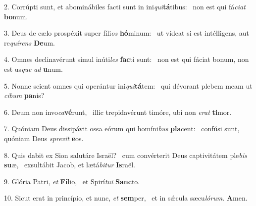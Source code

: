 2. Corrúpti sunt, et abominábiles facti sunt in ini\textit{qui}\textbf{tá}tibus: \ast\  non est qui fá\textit{ci}\textit{at} \textbf{bo}num.\

3. Deus de cælo prospéxit super fíli\textit{os} \textbf{hó}minum: \ast\  ut vídeat si est intélligens, aut re\textit{quí}\textit{rens} \textbf{De}um.\

4. Omnes declinavérunt simul inúti\textit{les} \textbf{fac}ti sunt: \ast\  non est qui fáciat bonum, non est us\textit{que} \textit{ad} \textbf{u}num.\

5. Nonne scient omnes qui operántur ini\textit{qui}\textbf{tá}tem: \ast\  qui dévorant plebem meam ut \textit{ci}\textit{bum} \textbf{pa}nis?\

6. Deum non invo\textit{ca}\textbf{vé}runt, \ast\  illic trepidavérunt timóre, ubi non \textit{e}\textit{rat} \textbf{ti}mor.\

7. Quóniam Deus dissipávit ossa eórum qui homíni\textit{bus} \textbf{pla}cent: \ast\  confúsi sunt, quóniam Deus \textit{spre}\textit{vit} \textbf{e}os.\

8. Quis dabit ex Sion salutáre Israël? \dag\  cum convérterit Deus captivitátem ple\textit{bis} \textbf{su}æ, \ast\  exsultábit Jacob, et lætá\textit{bi}\textit{tur} \textbf{Is}raël.\

9. Glória Patri, \textit{et} \textbf{Fí}lio, \ast\  et Spirí\textit{tu}\textit{i} \textbf{Sanc}to.\

10. Sicut erat in princípio, et nunc, \textit{et} \textbf{sem}per, \ast\  et in sǽcula sæcu\textit{ló}\textit{rum}. \textbf{A}men.\

